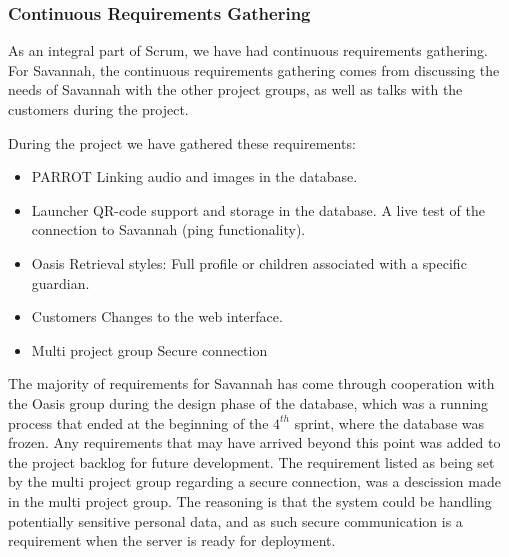 \subsubsection*{Continuous Requirements Gathering}
As an integral part of Scrum, we have had continuous requirements gathering.
For Savannah, the continuous requirements gathering comes from discussing the needs of Savannah with the other project groups, as well as talks with the customers
during the project.

During the project we have gathered these requirements:
\begin{itemize}
 \item PARROT
  \subitem Linking audio and images in the database.
 \item Launcher
  \subitem QR-code support and storage in the database.
  \subitem A live test of the connection to Savannah (ping functionality).
 \item Oasis
  \subitem Retrieval styles: Full profile or children associated with a specific guardian.
 \item Customers
  \subitem Changes to the web interface.
 \item Multi project group
  \subitem Secure connection
\end{itemize}

The majority of requirements for Savannah has come through cooperation with the Oasis group during the design phase of the database, which was a running process that ended
at the beginning of the $4^{th}$ sprint, where the database was frozen. Any requirements that may have arrived beyond this point was added to the project backlog for future development.
The requirement listed as being set by the multi project group regarding a secure connection, was a descission made in the multi project group. The reasoning is that the system could be 
handling potentially sensitive personal data, and as such secure communication is a requirement when the server is ready for deployment.